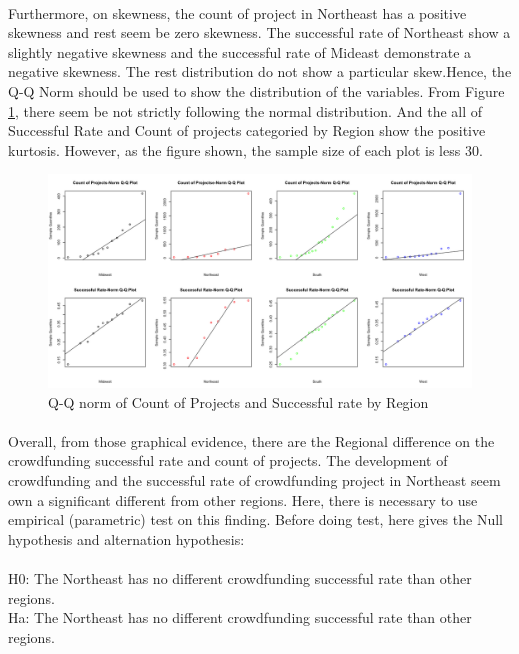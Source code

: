 \documentclass[a4paper,10pt]{article}
\begin{document}
\paragraph{}
Furthermore, on skewness, the count of project in Northeast has a positive skewness and rest seem be zero skewness. The successful rate of Northeast show a slightly negative skewness and the successful rate of Mideast demonstrate a negative skewness. The rest distribution do not show a particular skew.Hence, the Q-Q Norm should be used to show the distribution of the variables. From Figure \ref{Count and SR qqnorm}, there seem be not strictly following the normal distribution. And the all of Successful Rate and Count of projects categoried by Region show the positive kurtosis. However, as the figure shown, the sample size of each plot is less 30.
\begin{figure}
	\centering
	\includegraphics[width = 1\textwidth]{count_and_SR_qqnorm}
	\caption{Q-Q norm of Count of Projects and Successful rate by Region}
	\label{Count and SR qqnorm}
\end{figure}










\paragraph{}
Overall, from those graphical evidence, there are the Regional difference on the crowdfunding successful rate and count of projects. The development of crowdfunding and the successful rate of crowdfunding project in Northeast seem own a significant different from other regions. Here, there is necessary to use empirical (parametric) test on this finding. Before doing test, here gives the Null hypothesis and alternation hypothesis:
\paragraph{}
H0: The Northeast has no different crowdfunding successful rate than other regions.
	\\Ha: The Northeast has no different crowdfunding successful rate than other regions.
\end{document}
